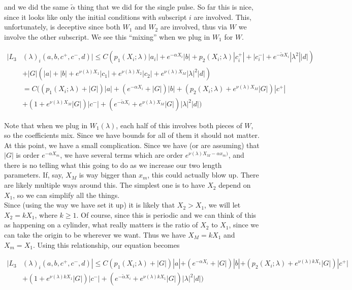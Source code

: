 \documentclass[12pt]{article}
\begin{document}
\begin{enumerate}
and we did the same $\tilde{\alpha}$ thing that we did for the single pulse. So far this is nice, since it looks like only the initial conditions with subscript $i$ are involved. This, unfortunately, is deceptive since both $W_1$ and $W_2$ are involved, thus via $W$ we involve the other subscript. We see this ``mixing'' when we plug in $W_1$ for $W$.

\begin{align*}
|L_3&(\lambda)_i(a, b, c^+, c^-, d)| \leq C ( p_1(X_i; \lambda)|a_i|
+ e^{-\alpha X_i}|b| + p_2(X_i; \lambda)|c_i^+| + |c_i^-| + e^{-\tilde{\alpha} X_i} |\lambda^2| |d| ) \\
&+ |G| (|a| + |b| + e^{\nu(\lambda)X_1}|c_1| + e^{\nu(\lambda)X_2}|c_2| + e^{\nu(\lambda)X_M}|\lambda|^2 |d| ) \\
&= C( (p_1(X_i; \lambda) + |G|)|a| + (e^{-\alpha X_i} + |G|) |b| + ( p_2(X_i; \lambda) + e^{\nu(\lambda)X_M} |G|) |c^+| \\
&+ (1 + e^{\nu(\lambda)X_M} |G|)|c^-| + (e^{-\tilde{\alpha} X_i} + e^{\nu(\lambda)X_M} |G|) |\lambda|^2 |d| )
\end{align*}

Note that when we plug in $W_1(\lambda)$, each half of this involves both pieces of $W$, so the coefficients mix. Since we have bounds for all of them it should not matter.\\ 

At this point, we have a small complication. Since we have (or are assuming) that $|G|$ is order $e^{-\alpha X_m}$, we have several terms which are order $e^{\nu(\lambda)X_M - \alpha x_m)}$, and there is no telling what this going to do as we increase our two length parameters. If, say, $X_M$ is way bigger than $x_m$, this could actually blow up. There are likely multiple ways around this. The simplest one is to have $X_2$ depend on $X_1$, so we can simplify all the things.\\

Since (using the way we have set it up) it is likely that $X_2 > X_1$, we will let $X_2 = k X_1$, where $k \geq 1$. Of course, since this is periodic and we can think of this as happening on a cylinder, what really matters is the ratio of $X_2$ to $X_1$, since we can take the origin to be wherever we want. Thus we have $X_M = k X_1$ and $X_m = X_1$. Using this relationship, our equation becomes

\begin{align*}
|L_3&(\lambda)_i(a, b, c^+, c^-, d)| \leq C (p_1(X_i; \lambda) + |G|)|a| + (e^{-\alpha X_i} + |G|) |b| + ( p_2(X_i; \lambda) + e^{\nu(\lambda) k X_1 } |G|) |c^+| \\
&+ (1 + e^{\nu(\lambda) k X_1} |G|)|c^-| + (e^{-\tilde{\alpha} X_i} + e^{\nu(\lambda)k X_1} |G|) |\lambda|^2 |d| )
\end{align*}


\end{enumerate}
\end{document}
